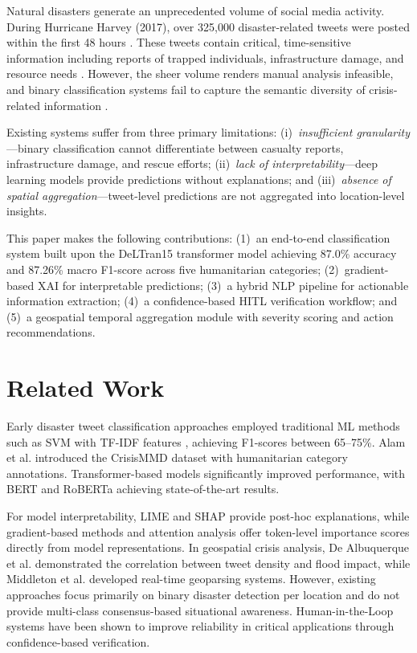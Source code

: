 \documentclass[pdflatex,sn-mathphys-num]{sn-jnl}
\theoremstyle{thmstyleone}%
\theoremstyle{thmstyletwo}%
\theoremstyle{thmstylethree}%
\begin{document}
Natural disasters generate an unprecedented volume of social media activity. During Hurricane Harvey (2017), over 325,000 disaster-related tweets were posted within the first 48 hours \cite{ref1}. These tweets contain critical, time-sensitive information including reports of trapped individuals, infrastructure damage, and resource needs \cite{ref2}. However, the sheer volume renders manual analysis infeasible, and binary classification systems fail to capture the semantic diversity of crisis-related information \cite{ref3}.

Existing systems suffer from three primary limitations: (i)~\textit{insufficient granularity}---binary classification cannot differentiate between casualty reports, infrastructure damage, and rescue efforts; (ii)~\textit{lack of interpretability}---deep learning models provide predictions without explanations; and (iii)~\textit{absence of spatial aggregation}---tweet-level predictions are not aggregated into location-level insights.

This paper makes the following contributions: (1)~an end-to-end classification system built upon the DeLTran15 \cite{ref16} transformer model achieving 87.0\% accuracy and 87.26\% macro F1-score across five humanitarian categories; (2)~gradient-based XAI for interpretable predictions; (3)~a hybrid NLP pipeline for actionable information extraction; (4)~a confidence-based HITL verification workflow; and (5)~a geospatial temporal aggregation module with severity scoring and action recommendations.

\section{Related Work}

Early disaster tweet classification approaches employed traditional ML methods such as SVM with TF-IDF features \cite{ref4}, achieving F1-scores between 65--75\%. Alam et al. \cite{ref5} introduced the CrisisMMD dataset with humanitarian category annotations. Transformer-based models significantly improved performance, with BERT \cite{ref6} and RoBERTa \cite{ref7} achieving state-of-the-art results.

For model interpretability, LIME \cite{ref8} and SHAP \cite{ref9} provide post-hoc explanations, while gradient-based methods \cite{ref10} and attention analysis \cite{ref11} offer token-level importance scores directly from model representations. In geospatial crisis analysis, De Albuquerque et al. \cite{ref12} demonstrated the correlation between tweet density and flood impact, while Middleton et al. \cite{ref13} developed real-time geoparsing systems. However, existing approaches focus primarily on binary disaster detection per location and do not provide multi-class consensus-based situational awareness. Human-in-the-Loop systems \cite{ref14, ref15} have been shown to improve reliability in critical applications through confidence-based verification.
\end{document}
